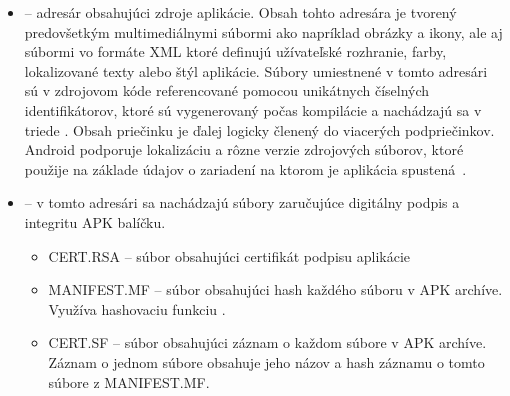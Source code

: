 \begin{itemize}
	\item {} -- adresár obsahujúci zdroje aplikácie. Obsah tohto adresára je tvorený predovšetkým multimediálnymi súbormi ako napríklad obrázky a ikony, ale aj súbormi vo formáte XML ktoré definujú užívateľské rozhranie, farby, lokalizované texty alebo štýl aplikácie. Súbory umiestnené v tomto adresári sú v zdrojovom kóde referencované pomocou unikátnych číselných identifikátorov, ktoré sú vygenerovaný počas kompilácie a nachádzajú sa v triede . Obsah priečinku je ďalej logicky členený do viacerých podpriečinkov. Android podporuje lokalizáciu a rôzne verzie zdrojových súborov, ktoré použije na základe údajov o zariadení na ktorom je aplikácia spustená~\cite{Resources}.
	
	\item {} -- v tomto adresári sa nachádzajú súbory zaručujúce digitálny podpis a integritu APK balíčku. 
		\begin{itemize}
			\item CERT.RSA  -- súbor obsahujúci certifikát podpisu aplikácie
			\item MANIFEST.MF  -- súbor obsahujúci hash každého súboru v APK archíve. Využíva hashovaciu funkciu .
			\item CERT.SF  -- súbor obsahujúci záznam o každom súbore v APK archíve. Záznam o jednom súbore obsahuje jeho názov a  hash záznamu o tomto súbore z MANIFEST.MF.
		\end{itemize}		
		
		
\end{itemize} 

